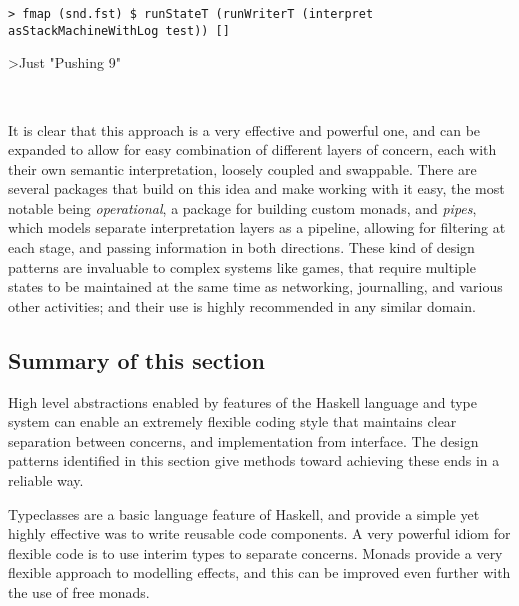\begin{verbatim}
> fmap (snd.fst) $ runStateT (runWriterT (interpret asStackMachineWithLog test)) []
\end{verbatim}\vspace{-1em}
>Just "Pushing 9\nMultiplying\nDuplicating\nMultiplying{}\nSubtracting\n"

\ 

\noindent
It is clear that this approach is a very effective and powerful one, and can be expanded to allow for easy combination of different layers of concern, each with their own semantic interpretation, loosely coupled and swappable. There are several packages that build on this idea and make working with it easy, the most notable being \emph{operational}, a package for building custom monads, and \emph{pipes}, which models separate interpretation layers as a pipeline, allowing for filtering at each stage, and passing information in both directions. These kind of design patterns are invaluable to complex systems like games, that require multiple states to be maintained at the same time as networking, journalling, and various other activities; and their use is highly recommended in any similar domain.

\subsection{Summary of this section}

High level abstractions enabled by features of the Haskell language and type system can enable an extremely flexible coding style that maintains clear separation between concerns, and implementation from interface. The design patterns identified in this section give methods toward achieving these ends in a reliable way.

Typeclasses are a basic language feature of Haskell, and provide a simple yet highly effective was to write reusable code components. A very powerful idiom for flexible code is to use interim types to separate concerns. Monads provide a very flexible approach to modelling effects, and this can be improved even further with the use of free monads.

